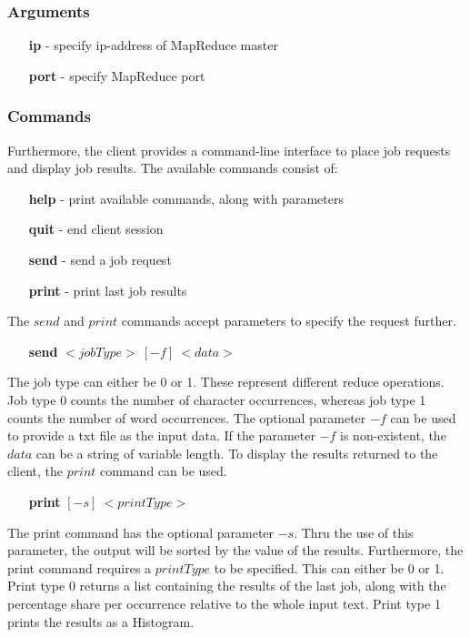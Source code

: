 \documentclass[12pt, letterpaper]{article}
\begin{document}
\subsubsection{Arguments} 
\begin{itemize}
	\item [\textbf{ip}] - specify ip-address of MapReduce master 
	\item [\textbf{port}] - specify MapReduce port
\end{itemize} 

\subsubsection{Commands}
Furthermore, the client provides a command-line interface to place job requests and display job results. The available commands consist of:

\begin{itemize}
	\item [\textbf{help}] - print available commands, along with parameters
	\item [\textbf{quit}] - end client session
	\item [\textbf{send}] - send a job request
	\item [\textbf{print}] - print last job results
\end{itemize}

The $send$ and $print$ commands accept parameters to specify the request further.

\begin{itemize}
	\item [\textbf{send}] $<jobType>\ [-f]\ <data>$
\end{itemize} 

The job type can either be 0 or 1. These represent different reduce operations.
Job type 0 counts the number of character occurrences, whereas job type 1 counts the number of word occurrences. The optional parameter $-f$ can be used to provide a txt file as the input data. If the parameter $-f$ is non-existent, the $data$ can be a string of variable length.\newline
To display the results returned to the client, the $print$ command can be used.
\begin{itemize}
	\item [\textbf{print}] $[-s]\ <printType>$
\end{itemize}  
The print command has the optional parameter $-s$. Thru the use of this parameter, the output will be sorted by the value of the results. Furthermore, the print command requires a $printType$ to be specified. This can either be 0 or 1. Print type 0 returns a list containing the results of the last job, along with the percentage share per occurrence relative to the whole input text. Print type 1 prints the results as a Histogram. 
\end{document}
